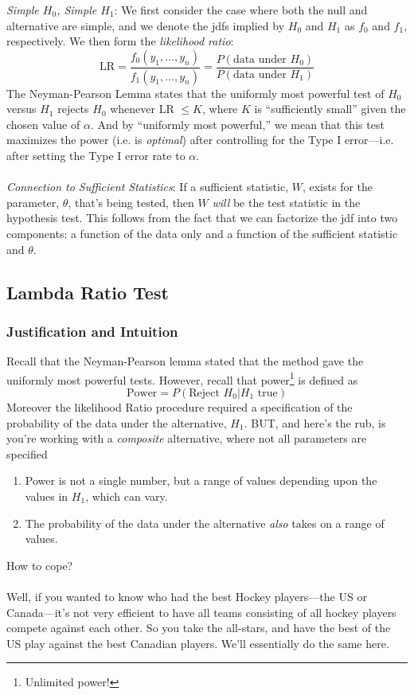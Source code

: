 \documentclass[12pt]{article}
\theoremstyle{plain}
\theoremstyle{definition}
\theoremstyle{remark}
\begin{document}
{\sl Simple $H_0$, Simple $H_1$}: We first consider the case where
both the null and alternative are simple, and we denote the jdfs
implied by $H_0$ and $H_1$ as $f_0$ and $f_1$, respectively. We
then form the \emph{likelihood ratio}:
\[ \text{LR} = \frac{f_0(y_1, \ldots, y_n)}{f_1(y_1, \ldots, y_n)}=
   \frac{P(\text{data under $H_0$})}{P(\text{data under $H_1$})}
   \]
The Neyman-Pearson Lemma states that the uniformly most powerful
test of $H_0$ versus $H_1$ rejects $H_0$ whenever LR $\leq K$,
where $K$ is ``sufficiently small'' given the chosen value of $\alpha$.
And by ``uniformly most powerful,'' we mean that this test
maximizes the power (i.e. is \emph{optimal})
after controlling for the Type I error---i.e.
after setting the Type I error rate to $\alpha$.
\\
\\
{\sl Connection to Sufficient Statistics}: If a sufficient statistic,
$W$, exists for the parameter, $\theta$, that's being tested, then
$W$ \emph{will} be the test statistic in the hypothesis test. This
follows from the fact that we can factorize the jdf into two
components: a function of the data only and a function of the sufficient
statistic and $\theta$.

\subsection{Lambda Ratio Test}

\subsubsection{Justification and Intuition}

Recall that the Neyman-Pearson lemma stated that the method gave
the uniformly most powerful tests. However, recall that power\footnote{
Unlimited power!} is defined as
   \[ \text{Power} = P(\text{Reject $H_0$} | \text{$H_1$ true}) \]
Moreover the likelihood Ratio procedure required a specification
of the probability of the data under the alternative, $H_1$. BUT,
and here's the rub, is you're working with a \emph{composite}
alternative, where not all parameters are specified
\begin{enumerate}
   \item Power is not a single number, but a range of values
      depending upon the values in $H_1$, which can vary.
   \item The probability of the data under the alternative \emph{also}
      takes on a range of values.
\end{enumerate}
How to cope?
\\
\\
Well, if you wanted to know who had the best Hockey players---the US
or Canada---it's not very efficient to have all teams consisting of
all hockey players compete against each other. So you take the
all-stars, and have the best of the US play against the best Canadian
players.  We'll essentially do the same here.
\end{document}
